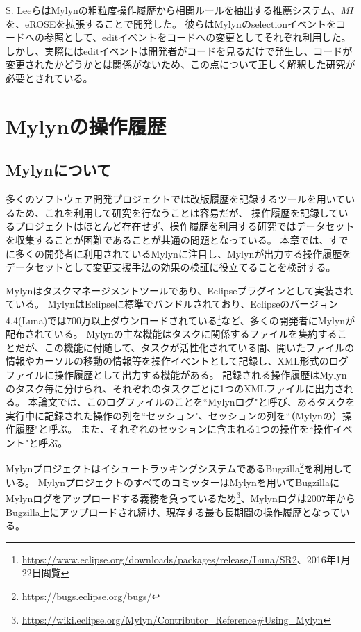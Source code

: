 \documentclass[a4paper]{jsbook}
\begin{document}
S. Leeら\cite{SLee:2015}はMylynの粗粒度操作履歴から相関ルールを抽出する推薦システム、{\it MI}を、eROSE\cite{Zimmermann:2005}を拡張することで開発した。
彼らはMylynのselectionイベントをコードへの参照として、editイベントをコードへの変更としてそれぞれ利用した。
しかし、実際にはeditイベントは開発者がコードを見るだけで発生し、コードが変更されたかどうかとは関係がないため、この点について正しく解釈した研究が必要とされている。

\chapter{Mylynの操作履歴}\label{mylyn_chap}
\section{Mylynについて}
多くのソフトウェア開発プロジェクトでは改版履歴を記録するツールを用いているため、これを利用して研究を行なうことは容易だが、
操作履歴を記録しているプロジェクトはほとんど存在せず、操作履歴を利用する研究ではデータセットを収集することが困難であることが共通の問題となっている。
本章では、すでに多くの開発者に利用されているMylynに注目し、Mylynが出力する操作履歴をデータセットとして変更支援手法の効果の検証に役立てることを検討する。

Mylyn\cite{Kersten:2005}はタスクマネージメントツールであり、Eclipseプラグインとして実装されている。
MylynはEclipseに標準でバンドルされており、Eclipseのバージョン4.4(Luna)では700万以上ダウンロードされている\footnote{\url{https://www.eclipse.org/downloads/packages/release/Luna/SR2}、2016年1月22日閲覧}など、多くの開発者にMylynが配布されている。
Mylynの主な機能はタスクに関係するファイルを集約することだが、この機能に付随して、タスクが活性化されている間、開いたファイルの情報やカーソルの移動の情報等を操作イベントとして記録し、XML形式のログファイルに操作履歴として出力する機能がある。
記録される操作履歴はMylynのタスク毎に分けられ、それぞれのタスクごとに1つのXMLファイルに出力される。
本論文では、このログファイルのことを``Mylynログ"と呼び、あるタスクを実行中に記録された操作の列を``セッション"、セッションの列を``（Mylynの）操作履歴"と呼ぶ。
また、それぞれのセッションに含まれる1つの操作を``操作イベント"と呼ぶ。

MylynプロジェクトはイシュートラッキングシステムであるBugzilla\footnote{\url{https://bugs.eclipse.org/bugs/}}を利用している。
MylynプロジェクトのすべてのコミッターはMylynを用いてBugzillaにMylynログをアップロードする義務を負っているため\footnote{\url{https://wiki.eclipse.org/Mylyn/Contributor_Reference\#Using_Mylyn}}、Mylynログは2007年からBugzilla上にアップロードされ続け、現存する最も長期間の操作履歴となっている。
\end{document}
